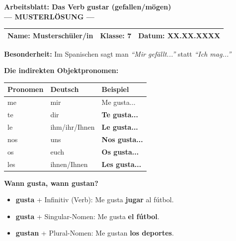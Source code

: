 \documentclass[11pt, a4paper]{article}
\newcommand{\fachfarbe}{spanisch}
\newcommand{\thema}{Das Verb gustar (gefallen/mögen)}
\newcommand{\klasse}{7}
\newcommand{\loesung}[1]{\textcolor{loesung}{\textbf{#1}}}
\newcommand{\es}[1]{\textcolor{\fachfarbe}{\textbf{#1}}}
\begin{document}
\begin{center}
    {\Large\bfseries\textcolor{\fachfarbe}{Arbeitsblatt: \thema}}\\[0.3em]
    {\large\textcolor{loesung}{\textbf{--- MUSTERLÖSUNG ---}}}
\end{center}

\vspace{5pt}

\noindent
\begin{tabularx}{\textwidth}{|X|X|X|}
\hline
\textbf{Name:} \textcolor{loesung}{Musterschüler/in} &
\textbf{Klasse:} \klasse &
\textbf{Datum:} \textcolor{loesung}{XX.XX.XXXX} \\
\hline
\end{tabularx}

\vspace{15pt}


\begin{merkkasten}

\textbf{Besonderheit:} Im Spanischen sagt man \textit{``Mir gefällt...''} statt \textit{``Ich mag...''}

\vspace{0.5em}

\textbf{Die indirekten Objektpronomen:}
\begin{center}
\begin{tabular}{|l|l|l|}
\hline
\textbf{Pronomen} & \textbf{Deutsch} & \textbf{Beispiel} \\
\hline
me & mir & Me gusta... \\
\hline
te & dir & \loesung{Te gusta...} \\
\hline
le & ihm/ihr/Ihnen & \loesung{Le gusta...} \\
\hline
nos & uns & \loesung{Nos gusta...} \\
\hline
os & euch & \loesung{Os gusta...} \\
\hline
les & ihnen/Ihnen & \loesung{Les gusta...} \\
\hline
\end{tabular}
\end{center}

\vspace{0.5em}

\textbf{Wann gusta, wann gustan?}
\begin{itemize}
    \item \es{gusta} + Infinitiv (Verb): Me gusta \textbf{jugar} al fútbol.
    \item \es{gusta} + Singular-Nomen: Me gusta \textbf{el fútbol}.
    \item \es{gustan} + Plural-Nomen: Me gustan \textbf{los deportes}.
\end{itemize}

\end{merkkasten}
\end{document}
